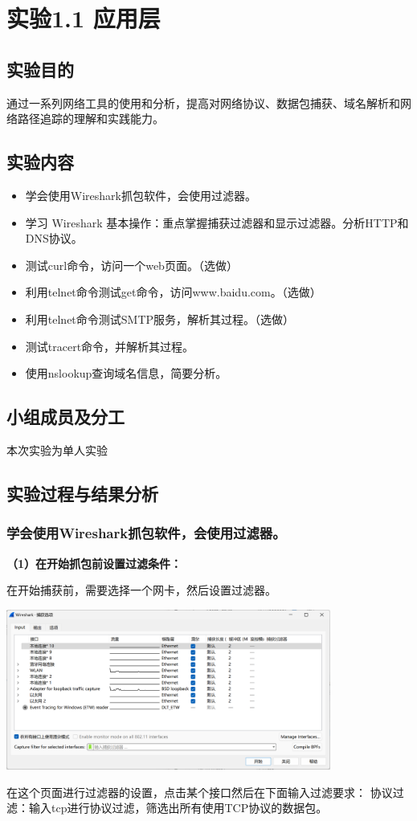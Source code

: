 \documentclass{article}
\begin{document}
 
\tableofcontents
\newpage

\newpage\section{实验1.1 应用层}
\subsection{实验目的}
通过一系列网络工具的使用和分析，提高对网络协议、数据包捕获、域名解析和网络路径追踪的理解和实践能力。
\subsection{实验内容}
\begin{itemize}
    \item 学会使用Wireshark抓包软件，会使用过滤器。
    \item 学习 Wireshark 基本操作：重点掌握捕获过滤器和显示过滤器。分析HTTP和DNS协议。
    \item 测试curl命令，访问一个web页面。（选做）
    \item 利用telnet命令测试get命令，访问www.baidu.com。（选做）
    \item 利用telnet命令测试SMTP服务，解析其过程。（选做）
    \item 测试tracert命令，并解析其过程。
    \item 使用nslookup查询域名信息，简要分析。
\end{itemize}
\subsection{小组成员及分工}
本次实验为单人实验
\subsection{实验过程与结果分析}
\subsubsection{学会使用Wireshark抓包软件，会使用过滤器。}
\textbf{（1）在开始抓包前设置过滤条件：}

在开始捕获前，需要选择一个网卡，然后设置过滤器。

\vspace{10pt}
\centerline{\includegraphics[width=0.8\textwidth]{1_1_images/1.png}}
\vspace{10pt}
在这个页面进行过滤器的设置，点击某个接口然后在下面输入过滤要求：
协议过滤：输入tcp进行协议过滤，筛选出所有使用TCP协议的数据包。
\end{document}
